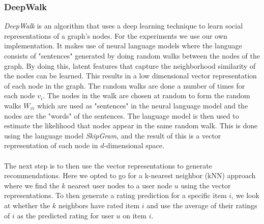 \subsubsection{DeepWalk}
\textit{DeepWalk} is an algorithm that uses a deep learning technique to learn social representations of a graph's nodes\cite{DeepWalk}.
For the experiments we use our own implementation.
It makes use of neural language models where the language consists of "sentences" generated by doing random walks between the nodes of the graph.
By doing this, latent features that capture the neighborhood similarity of the nodes can be learned.
This results in a low dimensional vector representation of each node in the graph.
The random walks are done a number of times for each node $v_i$.
The nodes in the walk are chosen at random to form the random walks $W_{vi}$ which are used as "sentences" in the neural language model and the nodes are the "words" of the sentences.
The language model is then used to estimate the likelihood that nodes appear in the same random walk.
This is done using the language model \textit{SkipGram}, and the result of this is a vector representation of each node in $d$-dimensional space.
\\\\
The next step is to then use the vector representations to generate recommendations.
Here we opted to go for a k-nearest neighbor (kNN) approach where we find the $k$ nearest user nodes to a user node $u$ using the vector representations.
To then generate a rating prediction for a specific item $i$, we look at whether the $k$ neighbors have rated item $i$ and use the average of their ratings of $i$ as the predicted rating for user $u$ on item $i$.
